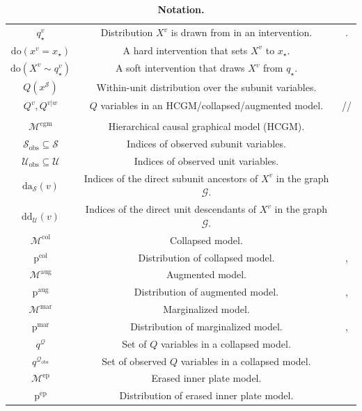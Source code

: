 \documentclass[12pt]{article}
\newcommand{\Sc}{\mathcal{S}}
\newcommand{\Uc}{\mathcal{U}}
\newcommand{\rmdo}{\mathrm{do}}
\newcommand{\dd}{\mathrm{dd}}
\newcommand{\da}{\mathrm{da}}
\newcommand{\pr}{\mathrm{p}}
\newcommand{\obs}{\mathrm{obs}}
\newcommand{\col}{\mathrm{col}}
\newcommand{\aug}{\mathrm{aug}}
\newcommand{\mar}{\mathrm{mar}}
\newcommand{\ep}{\mathrm{ep}}
\newcommand{\Mc}{\mathcal{M}}
\newcommand{\cgm}{\mathrm{cgm}}
\begin{document}
\begin{table}[h!]
\begin{tabular}{c c c}
	$q_\star^v$ & Distribution $X^v$ is drawn from in an intervention. & \Cref{def:intervention}.\\
	$\rmdo(x^v = x_\star)$ & A hard intervention that sets $X^v$ to $x_\star$. & \Cref{def:intervention} \\
	$\rmdo(X^v \sim q_\star^v)$ & A soft intervention that draws $X^v$ from $q_\star$. & \Cref{def:intervention} \\
	$Q(x^\mathcal{S})$ & Within-unit distribution over the subunit variables. & \Cref{sec:identification_problem} \\
	$Q^{v}, Q^{v|w}$ & $Q$ variables in an HCGM/collapsed/augmented model. & \Cref{def:hcgm}/\Cref{def:um}/ \\
	& & \Cref{eqn:augment_mech}\\
	$\Mc^\cgm$ & Hierarchical causal graphical model (HCGM). & \Cref{def:hcgm} \\
	$\Sc_\obs \subseteq \mathcal{S}$ & Indices of observed subunit variables. & \Cref{sec:identification_problem} \\
	$\Uc_\obs \subseteq \mathcal{U}$ & Indices of observed unit variables. & \Cref{sec:identification_problem} \\
	$\da_\Sc(v)$ & Indices of the direct subunit ancestors of $X^v$ in the graph $\mathcal{G}$. & \Cref{sec:collapse_theory} \\
	$\dd_\Uc(v)$ & Indices of the direct unit descendants of $X^v$ in the graph $\mathcal{G}$. & \Cref{sec:collapse_theory} \\
	$\Mc^\col$ & Collapsed model. & \Cref{def:um} \\
	$\pr^\col$ & Distribution of collapsed model. & \Cref{def:um}, \Cref{thm:valid_collapse} \\
	$\Mc^\aug$ & Augmented model. & \Cref{def:valid_augment}\\
	$\pr^\aug$ & Distribution of augmented model. & \Cref{def:valid_augment}, \Cref{sec:augment_marg_matches}\\
	$\Mc^\mar$ & Marginalized model. & \Cref{sec:augment_theory}\\
	$\pr^\mar$ & Distribution of marginalized model. & \Cref{sec:augment_theory}, \Cref{sec:augment_marg_matches}\\
	$q^\mathcal{Q}$ & Set of $Q$ variables in a collapsed model. & \Cref{sec:collapse_theory}\\
	$q^{\mathcal{Q}_\obs}$ & Set of observed $Q$ variables in a collapsed model. & \Cref{sec:collapse_theory}\\
	$\mathcal{M}^{\ep}$ & Erased inner plate model. & \Cref{sec:hierarchy_enables_id}\\
	$\pr^{\ep}$& Distribution of erased inner plate model.& \Cref{sec:hierarchy_enables_id}
\end{tabular}
\caption{\textbf{Notation.}} \label{table:notation}
\end{table} 
\end{document}
